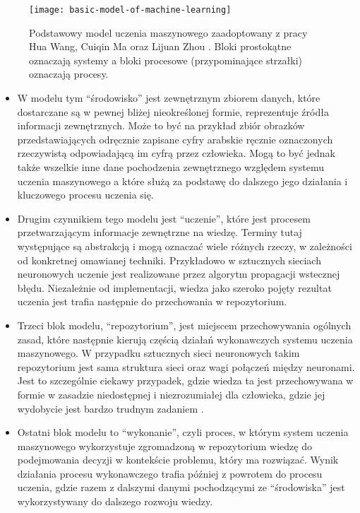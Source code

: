 \begin{figure}[ht]
  \texttt{[image: basic-model-of-machine-learning]}
  \caption[Podstawowy model uczenia maszynowego]{Podstawowy model uczenia maszynowego zaadoptowany z pracy Hua Wang, Cuiqin Ma oraz Lijuan Zhou \cite{wang2009brief}. Bloki prostokątne oznaczają systemy a bloki procesowe (przypominające strzałki) oznaczają procesy.}
  \label{fig:basic-model-of-machine-learning}
\end{figure}

\begin{itemize}

  \item W modelu tym ``środowisko'' jest zewnętrznym zbiorem danych, które dostarczane są w pewnej bliżej nieokreślonej formie, reprezentuje źródła informacji zewnętrznych.
        Może to być na przykład zbiór obrazków przedstawiających odręcznie zapisane cyfry arabskie ręcznie oznaczonych rzeczywistą odpowiadającą im cyfrą przez człowieka.
        Mogą to być jednak także wszelkie inne dane pochodzenia zewnętrznego względem systemu uczenia maszynowego a które służą za podstawę do dalszego jego działania i kluczowego procesu uczenia się.


  \item Drugim czynnikiem tego modelu jest ``uczenie'', które jest procesem przetwarzającym informacje zewnętrzne na wiedzę.
        Terminy tutaj występujące są abstrakcją i mogą oznaczać wiele różnych rzeczy, w zależności od konkretnej omawianej techniki.
        Przykładowo w sztucznych sieciach neuronowych uczenie jest realizowane przez algorytm propagacji wstecznej błędu.
        Niezależnie od implementacji, wiedza jako szeroko pojęty rezultat uczenia jest trafia następnie do przechowania w repozytorium.

  \item Trzeci blok modelu, ``repozytorium'', jest miejscem przechowywania ogólnych zasad, które następnie kierują częścią działań wykonawczych systemu uczenia maszynowego.
        W przypadku sztucznych sieci neuronowych takim repozytorium jest sama struktura sieci oraz wagi połączeń między neuronami.
        Jest to szczególnie ciekawy przypadek, gdzie wiedza ta jest przechowywana w formie w zasadzie niedostępnej i niezrozumiałej dla człowieka, gdzie jej wydobycie jest bardzo trudnym zadaniem \cite{boger1997knowledge}.

  \item Ostatni blok modelu to ``wykonanie'', czyli proces, w którym system uczenia maszynowego wykorzystuje zgromadzoną w repozytorium wiedzę do podejmowania decyzji w kontekście problemu, który ma rozwiązać.
        Wynik działania procesu wykonawczego trafia później z powrotem do procesu uczenia, gdzie razem z dalszymi danymi pochodzącymi ze ``środowiska'' jest wykorzystywany do dalszego rozwoju wiedzy.

\end{itemize}

